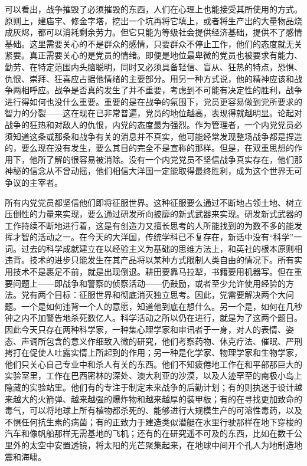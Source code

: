 可以看出，战争摧毁了必须摧毁的东西，人们在心理上也能接受其所使用的方式。原则上，建庙宇、修金字塔，挖出一个坑再将它填上，或者将生产出的大量物品烧成灰烬，都可以消耗剩余劳力。但它只能为等级社会提供经济基础，提供不了感情基础。这里需要关心的不是群众的感情，只要群众不停止工作，他们的态度就无关紧要。真正需要关心的是党员的情绪。即便是地位最卑微的党员也被要求有能力、勤劳、在特定范围内头脑聪明，同时又必须具备轻信、盲从、狂热的特点，恐惧、仇恨、崇拜、狂喜应占据他情绪的主要部分。用另一种方式说，他的精神应该和战争两相呼应。战争是否真的发生了并不重要，考虑到不可能有决定性的胜利，战争进行得如何也没什么重要。重要的是在战争的氛围下，党员更容易做到党所要求的智力的分裂------这在现在已非常普遍，党员的地位越高，表现得就越明显。论起对战争的狂热和对敌人的仇恨，内党的态度最为强烈。作为管理者，一个内党党员必须知道这条或那条和战争有关的消息并不真实，他可能经常发现整场战争都是捏造的，要么现在没有发生，要么其目的完全不是宣称的那样。但是，在双重思想的作用下，他所了解的很容易被消除。没有一个内党党员不坚信战争真实存在，他们那神秘的信念从不曾动摇，他们相信大洋国一定能取得最终胜利，成为这个世界无可争议的主宰者。

所有内党党员都坚信他们即将征服世界。这种征服要么通过不断地占领土地、树立压倒性的力量来实现，要么通过研发所向披靡的新式武器来实现。研发新式武器的工作持续不断地进行着，这是有创造力又擅长思考的人所能找到的为数不多的能发挥才智的活动之一。在今天的大洋国，传统学科已不复存在，新话中没有``科学''一词。过去的科学成就建立在以经验主义为基础的思维方法上，和英社的根本原则相违背。技术的进步只能发生在其产品将以某种方式限制人类自由的情况下。所有实用技术不是裹足不前，就是出现倒退。耕田要靠马拉犁，书籍要用机器写。但在重要问题上------即战争和警察的侦察活动------仍鼓励，或者至少允许使用经验的方法。党有两个目标：征服世界和彻底消灭独立思考。因此，党需要解决两个大问题。一个是如何违背一个人的意愿，知道他到底在想什么。另一个是，如何在几秒钟之内不加警告地杀死数亿人。科学活动之所以仍在进行，就是为了这两个题目。因此今天只存在两种科学家，一种集心理学家和审讯者于一身，对人的表情、姿态、声调所包含的意义作细致入微的研究，他们考察药物、休克疗法、催眠、严刑拷打在促使人吐露实情上所起到的作用；另一种是化学家、物理学家和生物学家，他们只关心自己专业中和杀人有关的东西。他们不知疲倦地工作在和平部那巨大的实验室里，工作在巴西密林的深处、澳大利亚的沙漠，以及人迹罕至的南极小岛上隐藏的实验站里。他们有的专注于制定未来战争的后勤计划；有的则执迷于设计越来越大的火箭弹、越来越强的爆炸物和越来越厚的装甲板；有的在寻找更加致命的毒气，可以将地球上所有植物都杀死的、能够进行大规模生产的可溶性毒药，以及不惧任何抗生素的病菌；有的正致力于建造类似潜艇在水里行驶那样在地下穿梭的汽车和像帆船那样无需基地的飞机；还有的在研究遥不可及的东西，比如在数千公里外的太空中安置透镜，将太阳的光芒聚集起来，在地球中间开个孔人为地制造地震和海啸。

